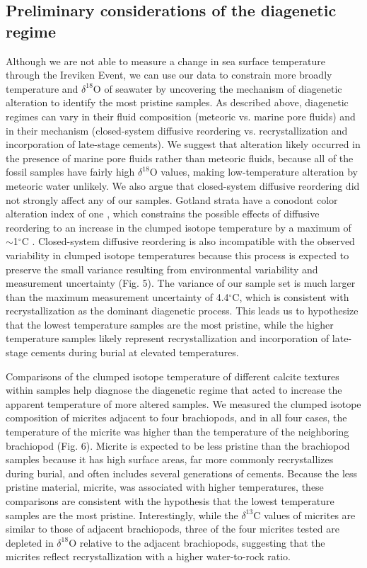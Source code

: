 \documentclass[preprint, authoryear]{elsarticle}
\begin{document}
\subsection{Preliminary considerations of the diagenetic regime}

Although we are not able to measure a change in sea surface temperature through the Ireviken Event, we can use our data to constrain more broadly temperature and $\delta^{18}$O of seawater by uncovering the mechanism of diagenetic alteration to identify the most pristine samples. As described above, diagenetic regimes can vary in their fluid composition (meteoric vs. marine pore fluids) and in their mechanism (closed-system diffusive reordering vs. recrystallization and incorporation of late-stage cements). We suggest that alteration likely occurred in the presence of marine pore fluids rather than meteoric fluids, because all of the fossil samples have fairly high $\delta^{18}$O values, making low-temperature alteration by meteoric water unlikely. We also argue that closed-system diffusive reordering did not strongly affect any of our samples. Gotland strata have a conodont color alteration index of one \citep{Epstein1976, Jeppsson1983}, which constrains the possible effects of diffusive reordering to an increase in the clumped isotope temperature by a maximum of $\sim$1$^{\circ}$C \citep{Dennis2010, Passey2012, Stolper2014}. Closed-system diffusive reordering is also incompatible with the observed variability in clumped isotope temperatures because this process is expected to preserve the small variance resulting from environmental variability and measurement uncertainty (Fig. 5). The variance of our sample set is much larger than the maximum measurement uncertainty of 4.4$^{\circ}$C, which is consistent with recrystallization as the dominant diagenetic process. This leads us to hypothesize that the lowest temperature samples are the most pristine, while the higher temperature samples likely represent recrystallization and incorporation of late-stage cements during burial at elevated temperatures.

Comparisons of the clumped isotope temperature of different calcite textures within samples help diagnose the diagenetic regime that acted to increase the apparent temperature of more altered samples. We measured the clumped isotope composition of micrites adjacent to four brachiopods, and in all four cases, the temperature of the micrite was higher than the temperature of the neighboring brachiopod (Fig. 6). Micrite is expected to be less pristine than the brachiopod samples because it has high surface areas, far more commonly recrystallizes during burial, and often includes several generations of cements. Because the less pristine material, micrite, was associated with higher temperatures, these comparisons are consistent with the hypothesis that the lowest temperature samples are the most pristine. Interestingly, while the $\delta^{13}$C values of micrites are similar to those of adjacent brachiopods, three of the four micrites tested are depleted in $\delta^{18}$O relative to the adjacent brachiopods, suggesting that the micrites reflect recrystallization with a higher water-to-rock ratio.
\end{document}
